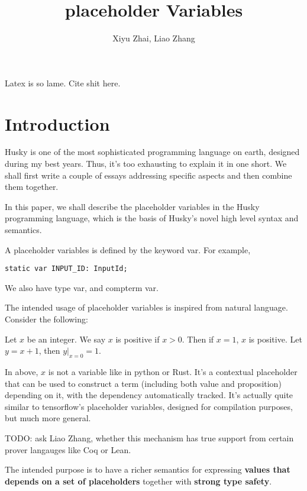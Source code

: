 \documentclass{article}
\title{placeholder Variables}
\author{Xiyu Zhai, Liao Zhang}
\date{}
\begin{document}
\maketitle

Latex is so lame. Cite shit \cite{someAuthor2023}here.

\section{Introduction}

Husky is one of the most sophisticated programming language on earth, designed during my best years. Thus, it's too exhausting to explain it in one short. We shall first write a couple of essays addressing specific aspects and then combine them together.

In this paper, we shall describe the placeholder variables in the Husky programming language, which is the basis of Husky's novel high level syntax and semantics.

A placeholder variables is defined by the keyword var. For example,
\begin{tcolorbox}[colback=gray!5,colframe=gray!50!black,title=Husky Code]
    \begin{lstlisting}[language=Husky]
static var INPUT_ID: InputId;
    \end{lstlisting}
\end{tcolorbox}

We also have type var, and compterm var.

The intended usage of placeholder variables is inspired from natural language. Consider the following:

\begin{tcolorbox}[colback=gray!5,colframe=gray!50!black,title=Example]
    Let $x$ be an integer. We say $x$ is positive if $x>0$. Then if $x=1$, $x$ is positive. Let $y=x+1$, then $y|_{x=0}=1$.
\end{tcolorbox}

In above, $x$ is not a variable like in python or Rust. It's a contextual placeholder that can be used to construct a term (including both value and proposition) depending on it, with the dependency automatically tracked. It's actually quite similar to tensorflow's placeholder variables, designed for compilation purposes, but much more general.

TODO: ask Liao Zhang, whether this mechanism has true support from certain prover langauges like Coq or Lean.

The intended purpose is to have a richer semantics for expressing \textbf{values that depends on a set of placeholders} together with \textbf{strong type safety}.
\end{document}

